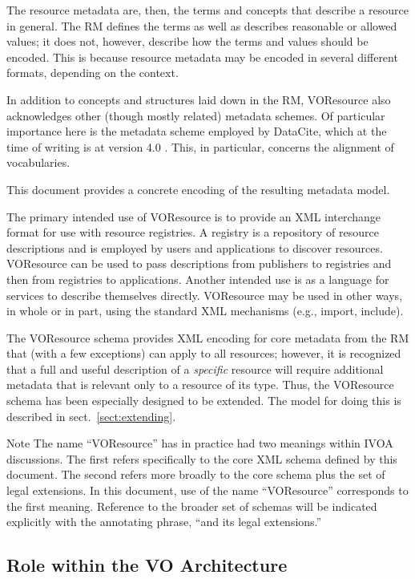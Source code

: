\documentclass[11pt,a4paper]{ivoa}
\begin{document}
The resource metadata are, then, the terms and concepts that describe
a resource in general.  The RM defines the terms as well as describes
reasonable or allowed values; it does not, however, describe how the
terms and values should be encoded.  This is because resource metadata
may be encoded in several different formats, depending on the
context.

In addition to concepts and structures laid down in the RM, VOResource
also acknowledges other (though mostly related) metadata schemes.  Of
particular importance here is the metadata scheme employed by DataCite,
which at the time of writing is at version 4.0 \citep{std:DataCite40}.
This, in particular, concerns the alignment of vocabularies.

This document provides a concrete encoding of the resulting metadata
model.

The primary intended use of VOResource is to provide an XML interchange
format for use with resource registries.  A registry is a repository of
resource descriptions and is employed by users and applications to
discover resources.  VOResource can be used to pass descriptions from
publishers to registries and then from registries to applications.
Another intended use is as a language for services to describe themselves
directly.  VOResource may be used in other ways, in whole or in part,
using the standard XML mechanisms (e.g., import, include).  

The VOResource schema provides XML encoding for core
metadata from the RM that (with a few exceptions)
can apply to all resources; however, it is recognized that a full and
useful description of a \emph{specific} resource will require
additional metadata that is relevant only to a resource of its type.
Thus, the VOResource schema has been especially designed to be
extended.  The model for doing this is described in
sect.~\ref{sect:extending}.

\begin{admonition}{Note}
The name ``VOResource'' has in practice had two meanings within
IVOA discussions.  The first refers specifically to the core
XML schema defined by this document.  The second refers more
broadly to the core schema plus the set of legal extensions.
In this document, use of the name ``VOResource'' corresponds to
the first meaning.  Reference to the broader set of schemas
will be indicated explicitly with the annotating phrase, ``and
its legal extensions.''
\end{admonition}

\subsection{Role within the VO Architecture}
\label{sect:role}
\end{document}
